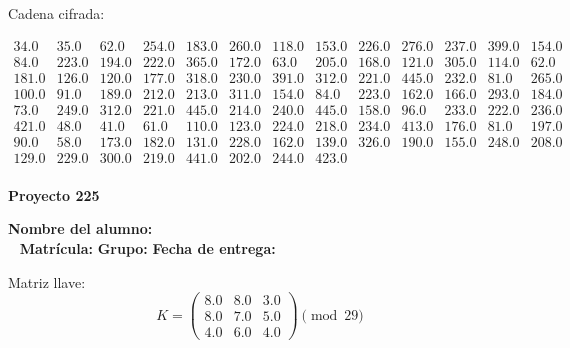 \documentclass[12pt]{article}
\begin{document}
Cadena cifrada:
\begin{center}
$\begin{array}{lllllllllllll}
34.0 & 35.0 & 62.0 & 254.0 & 183.0 & 260.0 & 118.0 & 153.0 & 226.0 & 276.0 & 237.0 & 399.0 & 154.0\\
84.0 & 223.0 & 194.0 & 222.0 & 365.0 & 172.0 & 63.0 & 205.0 & 168.0 & 121.0 & 305.0 & 114.0 & 62.0\\
181.0 & 126.0 & 120.0 & 177.0 & 318.0 & 230.0 & 391.0 & 312.0 & 221.0 & 445.0 & 232.0 & 81.0 & 265.0\\
100.0 & 91.0 & 189.0 & 212.0 & 213.0 & 311.0 & 154.0 & 84.0 & 223.0 & 162.0 & 166.0 & 293.0 & 184.0\\
73.0 & 249.0 & 312.0 & 221.0 & 445.0 & 214.0 & 240.0 & 445.0 & 158.0 & 96.0 & 233.0 & 222.0 & 236.0\\
421.0 & 48.0 & 41.0 & 61.0 & 110.0 & 123.0 & 224.0 & 218.0 & 234.0 & 413.0 & 176.0 & 81.0 & 197.0\\
90.0 & 58.0 & 173.0 & 182.0 & 131.0 & 228.0 & 162.0 & 139.0 & 326.0 & 190.0 & 155.0 & 248.0 & 208.0\\
129.0 & 229.0 & 300.0 & 219.0 & 441.0 & 202.0 & 244.0 & 423.0\\
\end{array}$
\end{center}

\newpage


\textbf{Proyecto 225}

\textbf{Nombre del alumno:} \underline{\hspace{13cm}}\\\
\vspace{1cm}
\textbf{Matrícula:} \underline{\hspace{4cm}} \hspace{1cm}
\textbf{Grupo:} \underline{\hspace{2cm}}
\textbf{Fecha de entrega:} \underline{\hspace{2cm}}

\medskip

Matriz llave:
\[
K = \begin{pmatrix}
8.0 & 8.0 & 3.0\\
8.0 & 7.0 & 5.0\\
4.0 & 6.0 & 4.0
\end{pmatrix} \pmod{29}
\]
\end{document}
